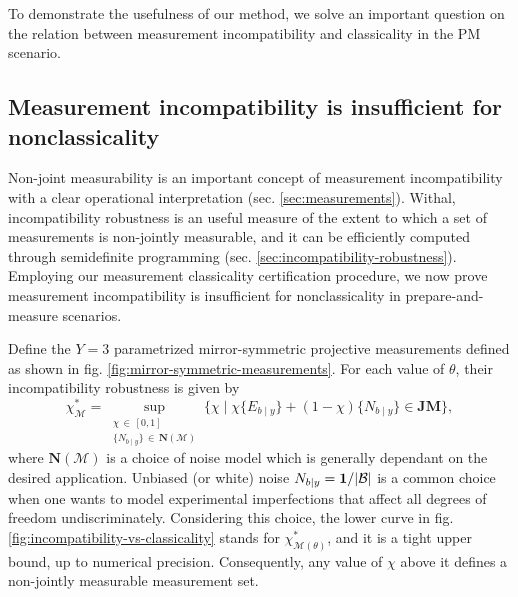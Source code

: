         To demonstrate the usefulness of our method, we solve an important question on the relation between measurement incompatibility and classicality in the PM scenario.

        \subsection{Measurement incompatibility is insufficient for nonclassicality}
        \label{sec:incompatibility-vs-classicality}

            Non-joint measurability is an important concept of measurement incompatibility with a clear operational interpretation (sec. \ref{sec:measurements}). Withal, incompatibility robustness is an useful measure of the extent to which a set of measurements is non-jointly measurable, and it can be efficiently computed through semidefinite programming (sec. \ref{sec:incompatibility-robustness}). Employing our measurement classicality certification procedure, we now prove measurement incompatibility is insufficient for nonclassicality in prepare-and-measure scenarios.

            Define the $Y=3$ parametrized mirror-symmetric projective measurements defined as shown in fig. \ref{fig:mirror-symmetric-measurements}. For each value of $\theta$, their incompatibility robustness is given by
            \begin{equation}
                    \chi^*_\mathcal{M} = \sup_{\substack{\chi \,\in\, [0, 1]\\ \{ N_{b \mid y}\} \,\in\, \textbf{N}( \mathcal{M} )}} \Big\{ \chi \mid \chi \{ E_{b \mid y} \} + (1 - \chi) \{ N_{b \mid y} \} \in \textbf{JM} \Big\} ,
            \end{equation}
            where $\mathbf{N}(\mathcal{M})$ is a choice of noise model which is generally dependant on the desired application. Unbiased (or white) noise $N_{b|y} = \mathbf{1}/\abs{\mathcal{B}}$ is a common choice when one wants to model experimental imperfections that affect all degrees of freedom undiscriminately. Considering this choice, the lower curve in fig. \ref{fig:incompatibility-vs-classicality} stands for $\chi^*_{\mathcal{M}(\theta)}$, and it is a tight upper bound, up to numerical precision. Consequently, any value of $\chi$ above it defines a non-jointly measurable measurement set.

